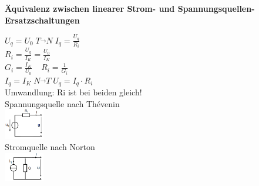 \textbf{Äquivalenz zwischen linearer Strom- und Spannungsquellen-Ersatzschaltungen}
\begin{multicols}{3}
	$ U_q = U_0 \; T \overrightarrow{} N \; I_{q} = \frac{U_{q}}{R_{i}} $\\
	$ R_i = \frac{U_q}{I_K} = \frac{U_0}{I_K} $\\
	$ G_i = \frac{I_K}{U_0}\ \ \ \ \ R_i = \frac{1}{G_i}$\\
	$ I_q = I_K \; N \overrightarrow{} T \; U_q = I_q \cdot R_i $\\
	Umwandlung: Ri ist bei beiden gleich!\\
	Spannungsquelle nach Thévenin\\
	\includegraphics[width=0.13\textwidth]{pics/dcnet/ersatz_spannung}\\
	Stromquelle nach Norton\\
	\includegraphics[width=0.13\textwidth]{pics/dcnet/ersatz_strom}\\
\end{multicols}

